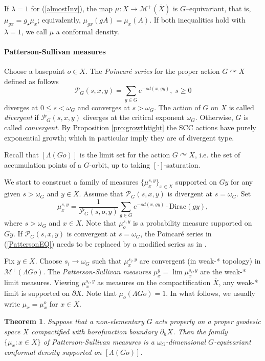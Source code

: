 \documentclass{amsart}
\newtheorem{thm}{Theorem}[section]
\theoremstyle{definition}
\theoremstyle{remark}
\newcommand{\act}{\curvearrowright}
\newcommand{\pG}{\Lambda{G}}
\newcommand{\p}{\mathcal P}
\newcommand{\U}{ X}
\newcommand{\bU}{\overline{  X}}
\newcommand{\hU}{\partial_h{  X}}
\newcommand{\pU}{\partial{  X}}
\newcommand{\dirac}[1]{{\mbox{Dirac}}{(#1)}}
\newcommand{\e}[1]{\omega_{#1}}
\begin{document}
If $\lambda=1$   for (\ref{almostInv}), the map $\mu: \U \to \mathcal M^+(\bU)$ is $G$--equivariant, that is, $\mu_{gx} = g_{\star}\mu_x$; equivalently, $\mu_{gx}(gA)=\mu_x(A)$. If both inequalities hold with $\lambda=1$, we call $\mu$ a conformal density. 
\newline
\paragraph{\textbf{Patterson-Sullivan measures}}
Choose a basepoint $o \in \U$.  
The \textit{Poincar\'e series} for the proper  action  $G \act \U$ defined as follows
$$
\p_G(s, x,y) =\sum\limits_{g \in G} e^{-sd(x, gy)}, \; s \ge 0
$$
diverges at $0\le s< \e G$ and converges at $s>\e G$. The   action of $G$ on $\U$ is called \textit{divergent} if $\p_{G}(s,x,y)$ diverges at the critical exponent $\e G$. Otherwise, $G$ is called \textit{convergent}. By Proposition \ref{pro:growthtight} the SCC actions have purely exponential growth; which in particular imply they are  of divergent type.

Recall that $[\Lambda (G o)]$ is the limit set for the  action $G\act \U$, i.e. the set of accumulation points of a $G$-orbit, up to taking $[\cdot]$-saturation. 



We start to construct a family of measures $\{\mu_x^{s,y}\}_{x \in \U}$ supported on $Gy$ for any given $s >\e G$ and $y\in \U$. Assume that $\p_G(s, x,y)$ is divergent at $s=\e G$. Set
\begin{equation}\label{PattersonEQ}
\mu_{x}^{s, y} = \frac{1}{\p_G(s, o, y)} \sum\limits_{g \in G} e^{-sd(x, gy)} \cdot \dirac{gy},
\end{equation}
where $s >\e G$ and $x \in \U$. Note that $\mu^{s, y}_o$ is a probability
measure supported on $Gy$. 
If $\p_G(s, x,y)$ is convergent at $s=\e G$, the Poincar\'e series in (\ref{PattersonEQ}) needs to be replaced by a modified series as in \cite{Patt}.   

 
Fix $y\in \U$.
Choose $s_i \to \e G$ such that $\mu_x^{s_i, y}$ are convergent (in weak-* topology) in
$\mathcal M^+(\pG o)$.  The \textit{Patterson-Sullivan measures} $\mu_x^y = \lim \mu_x^{s_i,y}$ are the weak-* limit 
measures. Viewing $\mu_x^{s_i,y}$ as measures on the compactification $\bU$, any weak-* limit is supported on $\pU$. Note that $\mu_o(\pG o) = 1$. In what follows, we usually write $\mu_x=\mu_x^o$ for $x\in \U$.

 
\begin{thm}\label{ConformalDensityExists}
Suppose that a non-elementary $G$ acts properly on a proper geodesic space  $\U$ compactified with horofunction boundary $\hU$. Then the family $\{\mu_x:x\in\U\}$  of Patterson-Sullivan measures is  a $\e G$-dimensional $G$-equivariant conformal density supported on $[\Lambda(Go)]$.     
\end{thm}
\end{document}
